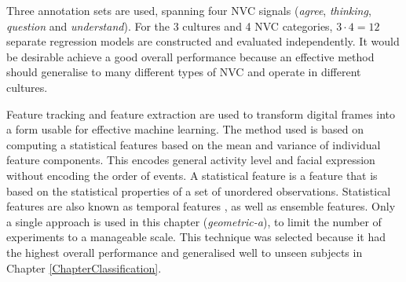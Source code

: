 Three \culturallySpecific annotation sets are used, spanning four \ac{NVC} signals (\textit{agree}, \textit{thinking}, \textit{question} and \textit{understand}).
For the 3 cultures and 4 \ac{NVC} categories, $3\cdot4=12$ separate regression models are constructed and evaluated independently. It would be desirable achieve a good overall performance because an effective method should generalise to many different types of \ac{NVC} and operate in different cultures.

Feature tracking and feature extraction are used to transform digital frames into a form usable for effective machine learning. The method used is based on computing a statistical features based on the mean and variance of individual feature components. This encodes general activity level and facial expression without encoding the order of events. A statistical feature is a feature that is based on the statistical properties of a set of unordered observations. Statistical features are also known as temporal features \cite{Chantler1997, Meng2007, Mognon2010}, as well as ensemble features.
Only a single \featureGeneration approach is used in this chapter (\textit{geometric-a}), to limit the number of experiments to a manageable scale. This technique was selected because it had the highest overall performance and generalised well to unseen subjects in Chapter \ref{ChapterClassification}. 

